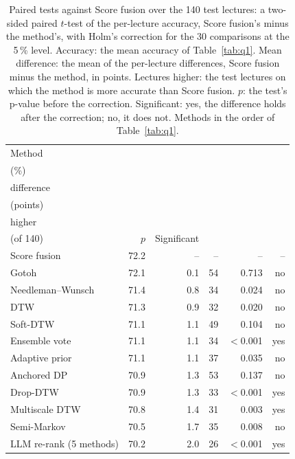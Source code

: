 \begin{table}[t]
\centering
\setlength{\tabcolsep}{1em}
\caption{Paired tests against Score fusion over the 140 test lectures: a two-sided paired $t$-test of the per-lecture accuracy, Score fusion's minus the method's, with Holm's correction for the 30 comparisons at the 5\,\% level. Accuracy: the mean accuracy of Table~\ref{tab:q1}. Mean difference: the mean of the per-lecture differences, Score fusion minus the method, in points. Lectures higher: the test lectures on which the method is more accurate than Score fusion. $p$: the test's p-value before the correction. Significant: yes, the difference holds after the correction; no, it does not. Methods in the order of Table~\ref{tab:q1}.}
\label{tab:significance}
\begin{tabular*}{\linewidth}{@{\extracolsep{\fill}}lrrrrr@{}}
\toprule
Method & \begin{tabular}[b]{@{}r@{}}Accuracy\\(\%)\end{tabular} & \begin{tabular}[b]{@{}r@{}}Mean\\difference\\(points)\end{tabular} & \begin{tabular}[b]{@{}r@{}}Lectures\\higher\\(of 140)\end{tabular} & $p$ & Significant \\
\midrule
Score fusion & 72.2 & -- & -- & -- & -- \\
Gotoh & 72.1 & 0.1 & 54 & 0.713 & no \\
Needleman--Wunsch & 71.4 & 0.8 & 34 & 0.024 & no \\
DTW & 71.3 & 0.9 & 32 & 0.020 & no \\
Soft-DTW & 71.1 & 1.1 & 49 & 0.104 & no \\
Ensemble vote & 71.1 & 1.1 & 34 & $<$0.001 & yes \\
Adaptive prior & 71.1 & 1.1 & 37 & 0.035 & no \\
Anchored DP & 70.9 & 1.3 & 53 & 0.137 & no \\
Drop-DTW & 70.9 & 1.3 & 33 & $<$0.001 & yes \\
Multiscale DTW & 70.8 & 1.4 & 31 & 0.003 & yes \\
Semi-Markov & 70.5 & 1.7 & 35 & 0.008 & no \\
LLM re-rank (5 methods) & 70.2 & 2.0 & 26 & $<$0.001 & yes \\

\end{tabular*}
\end{table}

